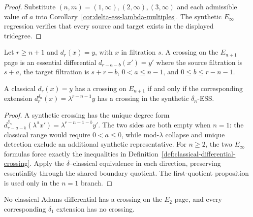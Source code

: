 \begin{proof}
  Substitute $(n,m)=(1,\infty),(2,\infty),(3,\infty)$ and each admissible
  value of $a$ into Corollary~\ref{cor:delta-ess-lambda-multiples}.  The
  synthetic $E_\infty$ regression verifies that every source and target exists
  in the displayed tridegree.
\end{proof}

\begin{definition}
  \label{def:classical-differential-crossing}
  \notready
  Let $r\ge n+1$ and $d_r(x)=y$, with $x$ in filtration $s$.  A crossing on
  the $E_{n+1}$ page is an essential differential
  $d_{r-a-b}(x')=y'$ where the source filtration is $s+a$, the target
  filtration is $s+r-b$, $0<a\le n-1$, and
  $0\le b\le r-n-1$.
\end{definition}

\begin{proposition}
  \label{prop:classical-crossing-iff-delta-crossing}
  \notready
  A classical $d_r(x)=y$ has a crossing on $E_{n+1}$ if and only if the
  corresponding extension
  $d_r^{\delta_n}(x)=\lambda^{r-n-1}y$ has a crossing in the synthetic
  $\delta_n$-ESS.
\end{proposition}

\begin{proof}
  A synthetic crossing has the unique degree form
  $d_{r-a-b}^{\delta_n}(\lambda^a x')=\lambda^{r-n-1-b}y'$.  The two
  sides are both empty when $n=1$: the classical range would require
  $0<a\le0$, while mod-$\lambda$ collapse and unique detection exclude an
  additional synthetic representative.  For $n\ge2$, the two $E_\infty$
  formulas force exactly the inequalities in
  Definition~\ref{def:classical-differential-crossing}.  Apply the
  $\delta$--classical equivalence in each direction, preserving essentiality
  through the shared boundary quotient.  The first-quotient proposition is
  used only in the $n=1$ branch.
\end{proof}

\begin{corollary}
  \label{cor:classical-e2-no-crossing}
  \notready
  No classical Adams differential has a crossing on the $E_2$ page, and every
  corresponding $\delta_1$ extension has no crossing.
\end{corollary}

